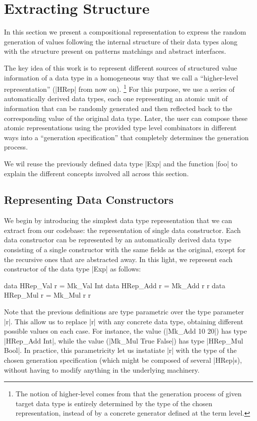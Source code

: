 \section{Extracting Structure} \label{sec:hrep}

In this section we present a compositional representation to express the random
generation of values following the internal structure of their data types along
with the structure present on patterns matchings and abstract interfaces.


The key idea of this work is to represent different sources of structured value
information of a data type in a homogeneous way that we call a ``higher-level
representation'' (|HRep| from now on).%
\footnote{The notion of higher-level comes from that the generation process of
  given target data type is entirely determined by the type of the chosen
  representation, instead of by a concrete generator defined at the term level.}
%
For this purpose, we use a series of automatically derived data types, each one
representing an atomic unit of information that can be randomly generated and
then reflected back to the corresponding value of the original data type.
%
Later, the user can compose these atomic representations using the provided type
level combinators in different ways into a ``generation specification'' that
completely determines the generation process.


We wil reuse the previously defined data type |Exp| and the function |foo| to
explain the different concepts involved all across this section.


\subsection*{\textbf{Representing Data Constructors}}

We begin by introducing the simplest data type representation that we can
extract from our codebase: the representation of single data constructor.
%
Each data constructor can be represented by an automatically derived data type
consisting of a single constructor with the same fields as the original, except
for the recursive ones that are abstracted away.
%
In this light, we represent each constructor of the data type |Exp| as follows:

\begin{code}
data HRep_Val  r = Mk_Val Int
data HRep_Add  r = Mk_Add r r
data HRep_Mul  r = Mk_Mul r r
\end{code}

Note that the previous definitions are type parametric over the type parameter
|r|.
%
This allow us to replace |r| with any concrete data type, obtaining different
possible values on each case.
%
For instance, the value (|Mk_Add 10 20|) has type |HRep_Add Int|, while the
value (|Mk_Mul True False|) has type |HRep_Mul Bool|.
%
In practice, this parametricity let us instatiate |r| with the type of the
chosen generation specification (which might be composed of several |HRep|s),
without having to modify anything in the underlying machinery.



